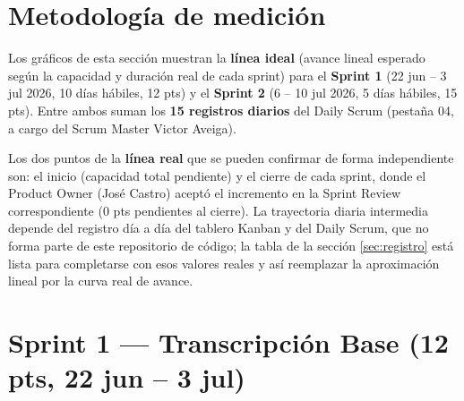 \documentclass[11pt]{article}
\begin{document}

\section{Metodología de medición}
Los gráficos de esta sección muestran la \textbf{línea ideal} (avance lineal esperado según la
capacidad y duración real de cada sprint) para el \textbf{Sprint 1} (22 jun -- 3 jul 2026, 10 días
hábiles, 12 pts) y el \textbf{Sprint 2} (6 -- 10 jul 2026, 5 días hábiles, 15 pts). Entre ambos suman los
\textbf{15 registros diarios} del Daily Scrum (pestaña 04, a cargo del Scrum Master Victor Aveiga).

Los dos puntos de la \textbf{línea real} que se pueden confirmar de forma independiente son: el inicio
(capacidad total pendiente) y el cierre de cada sprint, donde el Product Owner (José Castro) aceptó el
incremento en la Sprint Review correspondiente (0 pts pendientes al cierre). La trayectoria diaria
intermedia depende del registro día a día del tablero Kanban y del Daily Scrum, que no forma parte de
este repositorio de código; la tabla de la sección \ref{sec:registro} está lista para completarse con
esos valores reales y así reemplazar la aproximación lineal por la curva real de avance.

\section{Sprint 1 --- Transcripción Base (12 pts, 22 jun -- 3 jul)}

\begin{center}
\end{center}
\end{document}
